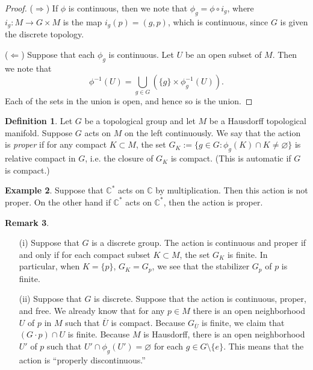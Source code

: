 \documentclass{amsart}
\numberwithin{equation}{section}
\theoremstyle{definition}
\newtheorem{definition}{Definition} [section]
\newtheorem{example}[definition]{Example}
\newtheorem{remark}[definition]{Remark}
\theoremstyle{theorem}
\begin{document}
\begin{proof}
($\Rightarrow$) If $\phi$ is continuous, then we note that $\phi_g = \phi \circ i_g$, where $i_g : M \to G\times M$ is the map $i_g(p) = (g,p)$, which is continuous, since $G$ is given the discrete topology. 

($\Leftarrow$) Suppose that each $\phi_g$ is continuous. Let $U$ be an open subset of $M$. Then we note that 
\[
\phi^{-1}(U) = \bigcup_{g \in G}(\{g\} \times \phi_g^{-1}(U)).
\]
Each of the sets in the union is open, and hence so is the union. 
\end{proof}



\begin{definition}
Let $G$ be a topological group and let $M$ be a Hausdorff topological manifold. 
Suppose $G$ acts on $M$ on the left continuously. We say that the action is {\em proper} if 
for any compact $K\subset M$, the set $G_K:=\{ g\in G: \phi_g(K)\cap K \neq \varnothing\}$
is relative compact in $G$, i.e. the closure of $G_K$ is compact. (This is automatic
if $G$ is compact.) 
\end{definition}



\begin{example}
Suppose that $\mathbb{C}^*$ acts on $\mathbb{C}$ by multiplication. Then this action is not proper. On the other hand if $\mathbb{C}^*$ acts on $\mathbb{C}^*$, then the action is proper. 
\end{example}

\begin{remark}
\begin{enumerate}
\item[(i)] Suppose that $G$ is a discrete group. The action is continuous and proper if and only if for each compact subset $K \subset M$, the set $G_K$ is finite. In particular, when $K = \{p\}$,
$G_K=G_p$, we see that the stabilizer $G_p$ of $p$ is finite.
\item[(ii)] Suppose that $G$ is discrete. Suppose that the action is continuous, proper, and free. We already know that for any $p \in M$ there is an open neighborhood $U$ of $p$ in $M$ such that $\overline{U}$ is compact. Because $G_{\overline{U}}$ is finite, we claim that $(G \cdot p) \cap U$ is finite. Because $M$ is Hausdorff, there is an open neighborhood $U'$ of $p$ such that 
$U' \cap \phi_g(U') = \varnothing$ for each $g \in G\setminus\{e\}$. This means that the action is ``properly discontinuous.''
\end{enumerate}
\end{remark}
\end{document}
